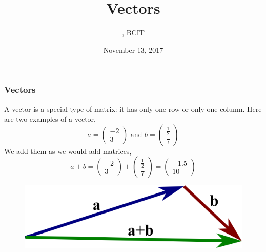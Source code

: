 \documentclass[xcolor=dvipsnames]{beamer}
\title{Vectors}
\subtitle{{\CourseNumber}, BCIT}
\author{\CourseName}
\date{November 13, 2017}
\begin{document}
\begin{frame}
  \titlepage
\end{frame}

\begin{frame}
  \frametitle{Vectors}
A vector is a special type of matrix: it has only one row or only one
column. Here are two examples of a vector,
\begin{equation}
  \label{eq:aesaimae}
  a=\left(
    \begin{array}{c}
      -2  \\
      3
    \end{array}\right)\mbox{ and }b=\left(
    \begin{array}{c}
      \frac{1}{2} \\
      7
    \end{array}\right)
\end{equation}
We add them as we would add matrices,
\begin{equation}
  \label{eq:baidohdi}
  a+b=\left(
    \begin{array}{c}
      -2 \\
      3
    \end{array}\right)+\left(
    \begin{array}{c}
      \frac{1}{2} \\
      7
    \end{array}\right)=\left(
    \begin{array}{c}
      -1.5 \\
      10
    \end{array}\right)
\end{equation}
  \begin{figure}[h]
    \includegraphics[scale=1]{./vector_a_plus_b.png}
  \end{figure}
\end{frame}
\end{document}
